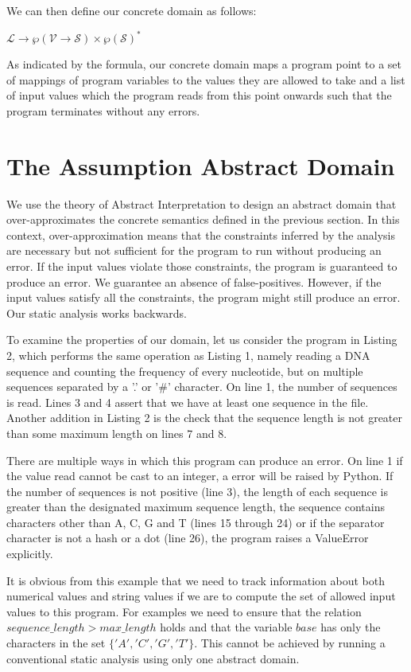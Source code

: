 \documentclass[]{report}
\begin{document}
We can then define our concrete domain as follows: 
\begin{center}
$\mathcal{L} \rightarrow \wp(\mathcal{V} \rightarrow \mathcal{S}) \times \wp(\mathcal{S})^{*}$
\end{center}

As indicated by the formula, our  concrete domain maps a program point to a set of mappings of program variables to the values they are allowed to take and a list of input values which the program reads from this point onwards such that the program terminates without any errors. 

\section{The Assumption Abstract Domain} \label{assumption-domain}
We use the theory of Abstract Interpretation \cite{cousot} to design an abstract domain that over-approximates the concrete semantics defined in the previous section. In this context, over-approximation means that the constraints inferred by the analysis are necessary but not sufficient for the program to run without producing an error. If the input values violate those constraints, the program is guaranteed to produce an error. We guarantee an absence of false-positives. However, if the input values satisfy all the constraints, the program might still produce an error. Our static analysis works backwards. 

To examine the properties of our domain, let us consider the program in Listing 2, which performs the same operation as Listing 1, namely reading a DNA sequence and counting the frequency of every nucleotide, but on multiple sequences separated by a '.' or '\#' character. On line 1, the number of sequences is read. Lines 3 and 4 assert that we have at least one sequence in the file. Another addition in Listing 2 is the check that the sequence length is not greater than some maximum length on lines 7 and 8. 

There are multiple ways in which this program can produce an error. On line 1 if the value read cannot be cast to an integer, a error will be raised by Python. If the number of sequences is not positive (line 3), the length of each sequence is greater than the designated maximum sequence length, the sequence contains characters other than A, C, G and T (lines 15 through 24) or if the separator character is not a hash or a dot (line 26), the program raises a ValueError explicitly. 

It is obvious from this example that we need to track information about both numerical values and string values if we are to compute the set of allowed input values to this program. For examples we need to ensure that the relation $sequence\_length > max\_length$ holds and that the variable $base$ has only the characters in the set $\lbrace'A', 'C', 'G', 'T' \rbrace$. This cannot be achieved by running a conventional static analysis using only one abstract domain.
\end{document}
